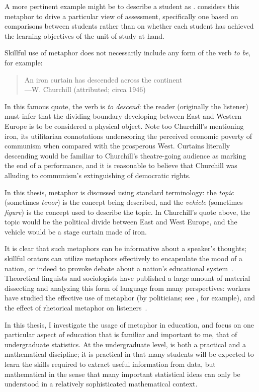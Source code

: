 A more pertinent example might be to describe a student as .   considers this metaphor to drive
a particular view of assessment, specifically one based on comparisons
between students rather than on whether each student has achieved the
learning objectives of the unit of study at hand.

Skillful use of metaphor does not necessarily include any form of the
verb \emph{to be}, for example:

\begin{quote}
      An iron curtain has descended across the continent\\
---W. Churchill (attributed; circa 1946)
\end{quote}

In this famous quote, the verb is \emph{to descend}: the reader
(originally the listener) must infer that the dividing boundary
developing between East and Western Europe is to be considered a
physical object. Note too Churchill's mentioning iron, its utilitarian
connotations underscoring the perceived economic poverty of communism
when compared with the prosperous West.  Curtains literally descending
would be familiar to Churchill's theatre-going audience as marking the
end of a performance, and it is reasonable to believe that Churchill
was alluding to communism's extinguishing of democratic rights.

In this thesis, metaphor is discussed using standard terminology: the
\emph{topic} (sometimes \emph{tenor}) is the concept being described,
and the \emph{vehicle} (sometimes \emph{figure}) is the concept used
to describe the topic.  In Churchill's quote above, the topic would be
the political divide between East and West Europe, and the vehicle
would be a stage curtain made of iron.

It is clear that such metaphors can be informative about a speaker's
thoughts; skillful orators can utilize metaphors effectively to
encapsulate the mood of a nation, or indeed to provoke debate about a
nation's educational system~\citep{robinson2011}.  Theoretical
linguists and sociologists have published a large amount of material
dissecting and analyzing this form of language from many perspectives:
workers have studied the effective use of metaphor (by politicians;
see , for example), and the effect of rhetorical
metaphor on listeners~\citep{keating2015}.

In this thesis, I investigate the usage of metaphor in education, and
focus on one particular aspect of education that is familiar and
important to me, that of undergraduate statistics.  At the
undergraduate level,  is both a practical and a
mathematical discipline; it is practical in that many students will be
expected to learn the skills required to extract useful information
from data, but mathematical in the sense that many important
statistical ideas can only be understood in a relatively sophisticated
mathematical context.


